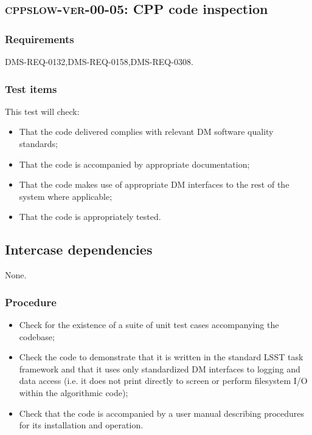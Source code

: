 \subsection{\textsc{cppslow-ver-00-05}: CPP code inspection}
\label{cppslow-ver-00-05}

\subsubsection{Requirements}

DMS-REQ-0132,DMS-REQ-0158,DMS-REQ-0308.

\subsubsection{Test items}

This test will check:

\begin{itemize}

  \item{That the code delivered complies with relevant DM software quality
  standards;}

  \item{That the code is accompanied by appropriate documentation;}

  \item{That the code makes use of appropriate DM interfaces to the rest of
  the system where applicable;}

  \item{That the code is appropriately tested.}
\end{itemize}

\subsection{Intercase dependencies}

None.

\subsubsection{Procedure}

\begin{itemize}

  \item{Check for the existence of a suite of unit test cases accompanying the
  codebase;}

  \item{Check the code to demonstrate that it is written in the standard LSST
  task framework and that it uses only standardized DM interfaces to logging
  and data access (i.e. it does not print directly to screen or perform
  filesystem I/O within the algorithmic code);}

  \item{Check that the code is accompanied by a user manual describing
  procedures for its installation and operation.}

\end{itemize}
